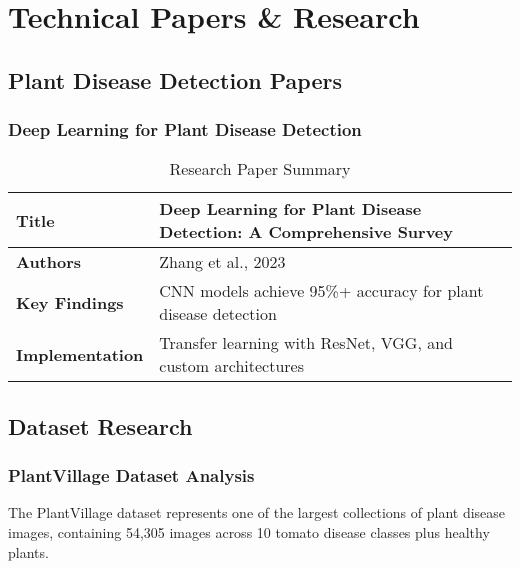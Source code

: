 \documentclass[12pt,a4paper]{article}
\begin{document}
\section{Technical Papers \& Research}

\subsection{Plant Disease Detection Papers}

\subsubsection{Deep Learning for Plant Disease Detection}
\begin{table}[H]
\centering
\begin{tabular}{|l|p{8cm}|}
\hline
\textbf{Title} & Deep Learning for Plant Disease Detection: A Comprehensive Survey \\
\hline
\textbf{Authors} & Zhang et al., 2023 \\
\hline
\textbf{Key Findings} & CNN models achieve 95\%+ accuracy for plant disease detection \\
\hline
\textbf{Implementation} & Transfer learning with ResNet, VGG, and custom architectures \\
\hline
\end{tabular}
\caption{Research Paper Summary}
\end{table}

\subsection{Dataset Research}

\subsubsection{PlantVillage Dataset Analysis}
The PlantVillage dataset represents one of the largest collections of plant disease images, containing 54,305 images across 10 tomato disease classes plus healthy plants.
\end{document}
